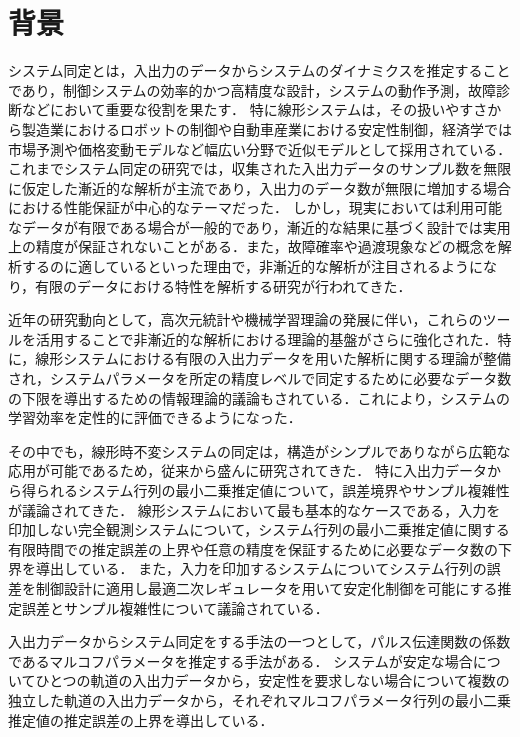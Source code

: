 \section{背景}
システム同定とは，入出力のデータからシステムのダイナミクスを推定することであり，制御システムの効率的かつ高精度な設計，システムの動作予測，故障診断などにおいて重要な役割を果たす\cite{SSSS, SITF}．
特に線形システムは，その扱いやすさから製造業におけるロボットの制御や自動車産業における安定性制御，経済学では市場予測や価格変動モデルなど幅広い分野で近似モデルとして採用されている．
これまでシステム同定の研究では，収集された入出力データのサンプル数を無限に仮定した漸近的な解析が主流であり，入出力のデータ数が無限に増加する場合における性能保証が中心的なテーマだった．
しかし，現実においては利用可能なデータが有限である場合が一般的であり，漸近的な結果に基づく設計では実用上の精度が保証されないことがある．また，故障確率や過渡現象などの概念を解析するのに適しているといった理由で，非漸近的な解析が注目されるようになり，有限のデータにおける特性を解析する研究が行われてきた．

近年の研究動向として，高次元統計\cite{HDPA, HDSA}や機械学習理論\cite{TEOS}の発展に伴い，これらのツールを活用することで非漸近的な解析における理論的基盤がさらに強化された．特に，線形システムにおける有限の入出力データを用いた解析に関する理論が整備され，システムパラメータを所定の精度レベルで同定するために必要なデータ数の下限を導出するための情報理論的議論もされている．これにより，システムの学習効率を定性的に評価できるようになった\cite{SLTF}．

その中でも，線形時不変システムの同定は，構造がシンプルでありながら広範な応用が可能であるため，従来から盛んに研究されてきた．
特に入出力データから得られるシステム行列の最小二乗推定値について，誤差境界やサンプル複雑性が議論されてきた．
線形システムにおいて最も基本的なケースである，入力を印加しない完全観測システムについて，システム行列の最小二乗推定値に関する有限時間での推定誤差の上界や任意の精度を保証するために必要なデータ数の下界を導出している\cite{FTIIU, FTIOL}．
また，入力を印加するシステムについてシステム行列の誤差を制御設計に適用し最適二次レギュレータを用いて安定化制御を可能にする推定誤差とサンプル複雑性について議論されている\cite{OTSCO}．

入出力データからシステム同定をする手法の一つとして，パルス伝達関数の係数であるマルコフパラメータを推定する手法がある．
システムが安定な場合についてひとつの軌道の入出力データから，安定性を要求しない場合について複数の独立した軌道の入出力データから，それぞれマルコフパラメータ行列の最小二乗推定値の推定誤差の上界を導出している\cite{RHKB, NAIOL}．


